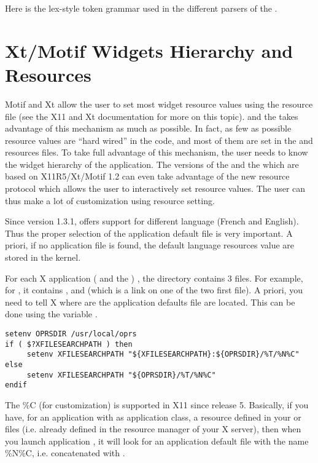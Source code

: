 Here is the lex-style token grammar used in the different parsers of the
\COPRSDE{}.


\chapter{Xt/Motif Widgets Hierarchy and Resources}

Motif and Xt allow the user to set most widget resource values using the
resource file (see the X11 \cite{Xlib-manual} and Xt \cite{Xt-manual}
documentation for more on this topic).  \XOPRS{} and the \OPE{} takes advantage
of this mechanism as much as possible. In fact, as few as possible resource
values are ``hard wired'' in the code, and most of them are set in the
 and  resources files. To take full advantage
of this mechanism, the user needs to know the widget hierarchy of the
application. The versions of the \XOPRS{} and the \OPE{} which are based on
X11R5/Xt/Motif 1.2 can even take advantage of the new resource protocol which
allows the user to interactively set resource values. The user can thus make a
lot of customization using resource setting.

Since version 1.3.1, \COPRS{} offers support for different language (French and
English). Thus the proper selection of the application default file is very
important. A priori, if no application file is found, the default language
resources value are stored in the kernel. 

For each X application (\XOPRS{} and the \OPE{}) , the 
directory contains 3 files.  For example, for \XOPRS{}, it contains
,  and  (which is a link on one of the
two first file). A priori, you need to tell X where are the application
defaults file are located. This can be done using the variable
.

\begin{verbatim}
setenv OPRSDIR /usr/local/oprs
if ( $?XFILESEARCHPATH ) then
     setenv XFILESEARCHPATH "${XFILESEARCHPATH}:${OPRSDIR}/%T/%N%C"
else
     setenv XFILESEARCHPATH "${OPRSDIR}/%T/%N%C"
endif
\end{verbatim}

The \%C (for customization) is supported in X11 since release 5. Basically, if
you have, for an application  with  as
application class, a  resource
defined in your  or  files (i.e. already
defined in the resource manager of your X server), then when you launch
application , it will look for an application default file with
the name \%N\%C, i.e.  concatenated with .

